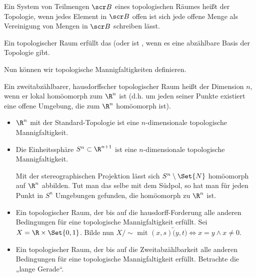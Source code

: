 \begin{df} \label{1.3} %
    Ein System von Teilmengen $\scr B$ eines topologischen Räumes heißt  der Topologie, wenn jedes Element in $\scr B$ offen ist sich jede offene Menge als Vereinigung von Mengen in $\scr B$ schreiben lässt.

    Ein topologischer Raum erfüllt das  (oder ist , wenn es eine abzählbare Basis der Topologie gibt.
\end{df}

Nun können wir topologische Mannigfaltigkeiten definieren.

\begin{df} \label{1.4} %
    Ein zweitabzählbarer, hausdorffscher topologischer Raum heißt  der Dimension $n$, wenn
    er lokal homöomorph zum $\R^n$ ist (d.h. um jeden seiner Punkte existiert eine offene Umgebung, die zum $\R^n$ homöomorph ist).
\end{df}

\begin{ex}
    \begin{itemize}
        \item
            $\R^n$ mit der Standard-Topologie ist eine $n$-dimensionale topologische Mannigfaltigkeit.
        \item
            Die Einheitssphäre $S^n \subset \R^{n+1}$ ist eine $n$-dimensionale topologische Mannigfaltigkeit.

            Mit der stereographischen Projektion lässt sich $S^n \setminus \Set{N}$ homöomorph auf $\R^n$ abbilden.
            Tut man das selbe mit dem Südpol, so hat man für jeden Punkt in $S^n$ Umgebungen gefunden, die homöomorph zu $\R^n$ ist.
        \item
            Ein topologischer Raum, der bis auf die hausdorff-Forderung alle anderen Bedingungen für eine topologische Mannigfaltigkeit erfüllt.
            Sei $X = \R \times \Set{0, 1}$.
            Bilde nun $X / \sim$ mit $(x,s) \tilde (y, t) \iff x = y \land x \neq 0$.
        \item
            Ein topologischer Raum, der bis auf die Zweitabzählbarkeit alle anderen Bedingungen für eine topologische Mannigfaltigkeit erfüllt.
            Betrachte die „lange Gerade“.
    \end{itemize}
\end{ex}

